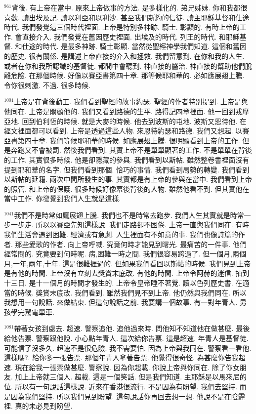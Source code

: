 \documentclass{book}
\begin{document}
$^{961}$背後.
有上帝在當中.
原來上帝做事的方法.
是多樣化的.
弟兄姊妹.
你和我都很喜歡.
讀出埃及記.
讀以利亞和以利沙.
甚至我們新約的信徒.
讀主耶穌基督和仕途時代.
我們發覺這三個時代裡面.
上帝是特別多神跡.
騎士.
彰顯的.
有時上帝的工作.
會直接介入.
我們發覺在舊因歷史裡面.
出埃及的時代.
列王的時代.
和耶穌基督.
和仕途的時代.
是最多神跡.
騎士彰顯.
當然從聖經神學我們知道.
這個和舊因的歷史.
很有關係.
是講述上帝直接的介入和拯救.
我們留意到.
在你和我的人生.
或者在你和我所認識的基督徒.
都間中會聽到.
神直接的醫治.
神直接的幫助他們脫離危險.
在那個時候.
好像以賽亞書第四十章.
那等候耶和華的.
必如應展翅上騰.
令你很刺激.
不過.
很多時候.

$^{1001}$上帝是在背後動工.
我們看到聖經的故事約瑟.
聖經的作者特別提到.
上帝是與他同在.
上帝是關顧他的.
我們又看到路德的生平.
路得記四章裡面.
他一回到戎摩亞地.
回到伯利恆的時候.
就是大麥的時候.
他去到波斯的屯地.
波斯又恩待他.
在經文裡面都可以看到.
上帝是透過這些人物.
來恩待約瑟和路德.
我們又想起.
以賽亞書第四十章.
我們等候耶和華的時候.
如應展翅上騰.
很明顯看到上帝的工作.
但是奔跑又不會被罰.
然後我們看到.
其實上帝不是單單顯著的工作.
不是單單在背後的工作.
其實很多時候.
他是卻隱藏的參與.
我們看到以斯帖.
雖然整卷書裡面沒有提到耶和華的名字.
但我們看到那個.
恰巧的事情.
我們看到局勢的轉變.
我們看到以斯帖的延籍.
兩次中間所發生的事.
其實都是有上帝的參與在當中.
我們看到上帝的照管.
和上帝的保護.
很多時候好像幕後背後的人物.
雖然他看不到.
但其實他在當中工作.
你發覺到我們人生就是這樣.

$^{1041}$我們不是時常如鷹展翅上騰.
我們也不是時常去跑步.
我們人生其實就是時常一步一步走.
所以以賽亞先知這樣說.
我們走路卻不困倦.
上帝一直與我們同在.
有時我們生活會遇到困難.
經濟或有急劇.
人生裡面有不如意的事.
我們也像詩篇的作者.
那些愛歌的作者.
向上帝呼喊.
究竟何時才能見到曙光.
最痛苦的一件事.
他們經常問的.
究竟要到何時呢.
病,困難一時之間.
我們很容易跨過了.
但一個月,兩個月,一年,兩年,十年.
這是很難捱過的.
但如果我們看回以斯帖的時候.
我們見到上帝是有他的時間.
上帝沒有立刻去獎賞末底改.
有他的時間.
上帝令阿赫的迷信.
抽到十三日.
是十一個月的時間才發生的.
上帝令皇帝睡不著覺.
讀以色列歷史書.
在適當的時候.
獎賞末底改.
我們看到.
雖然我們見不到上帝.
他仍然與我們同在.
所以我想用一句說話.
來做結束.
但這句說話之前.
我要講一個故事.
有一對年青人.
男孩學完駕電單車.

$^{1081}$帶著女孩到處去.
超速.
警察追他.
追他過來時.
問他知不知道他在做甚麼.
最後給他告票.
警察跟他說.
小心點年青人.
這次給你告票.
這是超速.
年青人是基督徒.
可能信了沒多久.
超速不是很危險.
我不需要怕.
因為上帝與我同在.
警察看一看他.
這樣嗎?.
給你多一張告票.
那個年青人拿著告票.
他覺得很奇怪.
為甚麼你告我超速.
現在給我一張票做甚麼.
警察說.
因為你超載.
你說上帝與你同在.
除了你女朋友.
加上上帝就三個人.
超載.
這是一個笑話.
但是我們知道.
主耶穌是以馬來尼的位.
所以有一句說話這樣說.
近來在香港很流行.
不是因為有盼望.
我們去堅持.
而是因為我們堅持.
所以我們見到盼望.
這句說話你再回去想一想.
他說不是在陰霾裡.
真的未必見到盼望.
\end{document}
